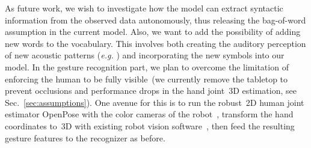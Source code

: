As future work, we wish to investigate how the model can extract syntactic information from the observed data autonomously, thus releasing the bag-of-word assumption in the current model.
Also, we want to add the possibility of adding new words to the vocabulary.
This involves both creating the auditory perception of new acoustic patterns (\textit{e.g.} \cite{falstrom:2017:glu, vanhainen2014:icassp, vanhainen:2012:interspeech}) and incorporating the new symbols into our \AffWords{} model.
In the gesture recognition part, we plan to overcome the limitation of enforcing the human to be fully visible~(we currently remove the tabletop to prevent occlusions and performance drops in the hand joint~3D estimation, see Sec.~\ref{sec:assumptions}).
One avenue for this is to run the robust~2D human joint estimator OpenPose with the color cameras of the robot~\cite{cao:2017:openpose-cpvr}, transform the hand coordinates to~3D with existing robot vision software~\cite{roncone:2016:rss}, then feed the resulting gesture features to the recognizer as before.


